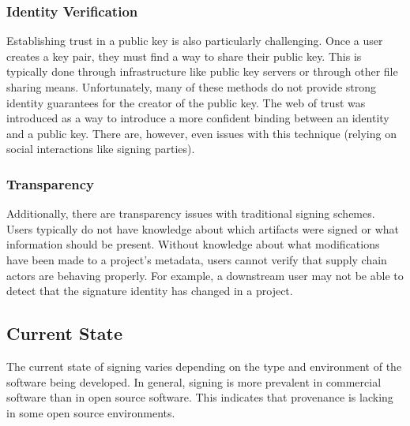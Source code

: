 \documentclass{IEEEcsmagTechrxiv}
\begin{document}
\subsubsection{Identity Verification}
Establishing trust in a public key is also particularly challenging.
Once a user creates a key pair, they must find a way to share their public key.
This is typically done through infrastructure like public key servers or through other file sharing means.
Unfortunately, many of these methods do not provide strong identity guarantees for the creator of the public key.
The web of trust was introduced as a way to introduce a more confident binding between an identity and a public key.
There are, however, even issues with this technique (\ie relying on social interactions like signing parties).

\subsubsection{Transparency}
Additionally, there are transparency issues with traditional signing schemes.
Users typically do not have knowledge about which artifacts were signed or what information should be present.
Without knowledge about what modifications have been made to a project's metadata, users cannot verify that supply chain actors are behaving properly.
For example, a downstream user may not be able to detect that the signature identity has changed in a project.


\subsection{Current State}

The current state of signing varies depending on the type and environment of the software being developed.
In general, signing is more prevalent in commercial software than in open source software.
This indicates that provenance is lacking in some open source environments.
\end{document}
